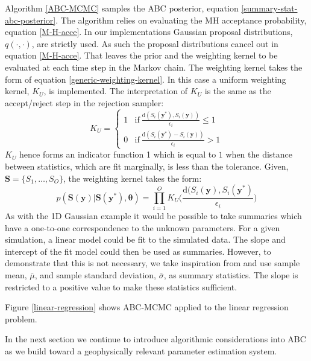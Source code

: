 Algorithm \ref{ABC-MCMC} samples the ABC posterior, equation \ref{summary-stat-abc-posterior}. The algorithm relies on evaluating the MH acceptance probability, equation \ref{M-H-acce}. In our implementations Gaussian proposal distributions, $q(\cdot,\cdot)$, are strictly used. As such the proposal distributions cancel out in equation \ref{M-H-acce}. That leaves the prior and the weighting kernel to be evaluated at each time step in the Markov chain. The weighting kernel takes the form of equation \ref{generic-weighting-kernel}. In this case a uniform weighting kernel, $K_U$, is implemented. The interpretation of $K_U$ is the same as the accept/reject step in the rejection sampler: 
\begin{equation}
	K_U = 
	\begin{cases}
		1 & \text{if}\ 	\frac{\text{d}(S_i(\bm{y^*}),S_i(\bm{y}))}				{\epsilon_i} \leq 1\\
		0 & \text{if}\ \frac{\text{d}(S_i(\bm{y^*}) - S_i(\bm{y}))}				{\epsilon_i} > 1
	\end{cases}
\end{equation}
$K_U$ hence forms an indicator function 1 which is equal to $1$ when the distance between statistics, which are fit marginally, is less than the tolerance. Given, $\bm{S} = \{S_1,\dots,S_O\}$, the weighting kernel takes the form:
\begin{equation}
	p(\bm{S}(\bm{y})|\bm{S}(\bm{y^*}),\bm{\theta}) = \prod_{i = 1}^{O} K_U\Big(\frac{\text{d}(S_i(\bm{y}),S_i(\bm{y^*})}{\epsilon_i}\Big)
	\label{weight-kernel}
\end{equation}
As with the 1D Gaussian example it would be possible to take summaries which have a one-to-one correspondence to the unknown parameters. For a given simulation, a linear model could be fit to the simulated data. The slope and intercept of the fit model could then be used as summaries. However, to demonstrate that this is not necessary, we take inspiration from \citet{vrugt2013toward} and use sample mean, $\bar{\mu}$, and sample standard deviation, $\bar{\sigma}$, as summary statistics. The slope is restricted to a positive value to make these statistics sufficient. \par

Figure \ref{linear-regression} shows ABC-MCMC applied to the linear regression problem. \par

In the next section we continue to introduce algorithmic considerations into ABC as we build toward a geophysically relevant parameter estimation system. \par

